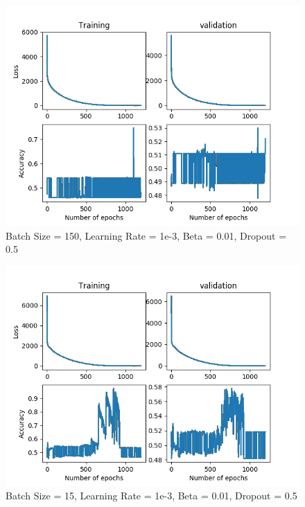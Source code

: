 \documentclass[12pt,reqno]{amsart}
\numberwithin{equation}{section}
\begin{document}
\begin{enumerate}
\begin{figure}[H]
\centering
\includegraphics[scale=0.6]{data12-1e-3-150-1e-2-5e-1}
\caption{Batch Size = 150, Learning Rate = 1e-3, Beta = 0.01, Dropout = 0.5}
\end{figure}

\begin{figure}[H]
\centering
\includegraphics[scale=0.6]{data12-1e-3-15-1e-2-5e-1}
\caption{Batch Size = 15, Learning Rate = 1e-3, Beta = 0.01, Dropout = 0.5}
\end{figure}


\end{enumerate}
\end{document}
